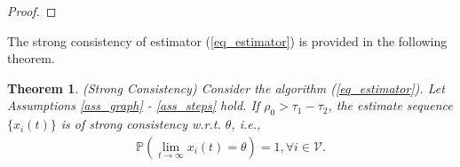 \documentclass[10pt,journal,final]{IEEEtran}
\newcommand{\norm}[1]{\left\lVert#1\right\rVert}
\theoremstyle{plain}
\newtheorem{theorem}{Theorem}[section]
\theoremstyle{definition}
\theoremstyle{remark}
\begin{document}
\begin{proof}
%
%
\end{proof}
The strong consistency of   estimator (\ref{eq_estimator}) is provided in the following theorem.
\begin{theorem}(Strong Consistency)
	Consider the algorithm (\ref{eq_estimator}). Let Assumptions \ref{ass_graph} - \ref{ass_steps} hold.
	If $\rho_0>\tau_1-\tau_2$, the estimate sequence $\{x_i(t)\}$ is of strong consistency w.r.t. $\theta$, i.e.,
	\begin{align}
	\mathbb{P}\left(\lim\limits_{t\rightarrow\infty}x_i(t)=\theta\right)=1, \forall i\in\mathcal{V}.
	\end{align}
\end{theorem}
\end{document}
